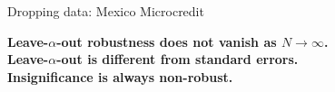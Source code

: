 

\begin{frame}{Dropping data: Mexico Microcredit}



\textbf{Leave-$\alpha$-out robustness does not vanish as $N \rightarrow \infty$.}\\
\textbf{Leave-$\alpha$-out is different from standard errors.}\\
\textbf{Insignificance is always non-robust.}

\end{frame}
